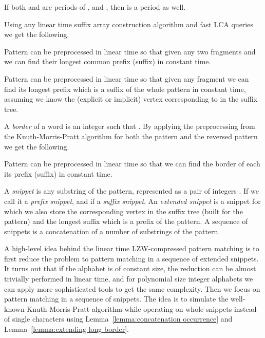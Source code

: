 \documentclass[runningheads]{llncs}
\begin{document}
\begin{lemma}\label{lemma:periodicity}
If both  and  are periods of , and , then  is a period as well.
\end{lemma}

Using any linear time suffix array construction algorithm and fast LCA queries~\cite{BenderLCA} we get the following.

\begin{lemma}\label{lemma:equality}
Pattern  can be preprocessed in linear time so that given any two fragments  and  we can find their longest common prefix (suffix) in constant time.
\end{lemma}

\begin{lemma}\label{lemma:longest suffix}
Pattern  can be preprocessed in linear time so that given any fragment  we can find its longest prefix which is a suffix of the whole pattern in constant time, assuming we know the (explicit or implicit) vertex corresponding to  in the suffix tree.
\end{lemma}

A {\it border} of a word  is an integer  such that . By applying the preprocessing from the Knuth-Morris-Pratt algorithm for both the pattern and the reversed pattern we get the following.

\begin{lemma}\label{lemma:borders preprocessing}
Pattern  can be preprocessed in linear time so that we can find the border of each its prefix (suffix) in constant time.
\end{lemma}

A {\it snippet} is any substring  of the pattern, represented as a pair of integers . If  we call it a {\it prefix snippet}, and if  a {\it suffix snippet}. An {\it extended snippet} is a snippet for which we also store the corresponding vertex in the suffix tree 
(built for the pattern) and the longest suffix which is a prefix of the pattern. A sequence of snippets is a concatenation of a number of substrings of the pattern.

A high-level idea behind the linear time LZW-compressed pattern matching is to first reduce the problem to pattern matching in a sequence of extended snippets. It turns out that if the alphabet is of constant size, the reduction can be almost trivially performed in linear time, and for polynomial size integer alphabets we can apply more sophisticated tools to get the same complexity. Then we focus on pattern matching in a sequence of snippets. The idea is to simulate the well-known Knuth-Morris-Pratt algorithm while operating on whole snippets instead of single characters using Lemma~\ref{lemma:concatenation occurrence} and Lemma~\ref{lemma:extending long border}.
\end{document}

